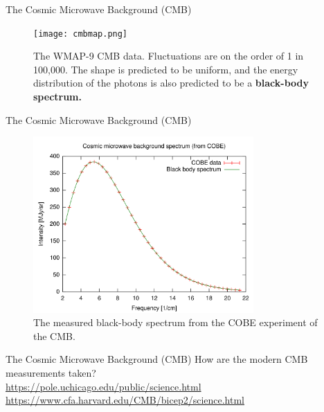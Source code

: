 \documentclass{beamer}
\begin{document}
\begin{frame}{The Cosmic Microwave Background (CMB)}
\begin{figure}
\centering
\texttt{[image: cmbmap.png]}
\caption{\label{fig:cmb6} The WMAP-9 CMB data.  Fluctuations are on the order of 1 in 100,000.  The shape is predicted to be uniform, and the energy distribution of the photons is also predicted to be a \textbf{black-body spectrum.}}
\end{figure}
\end{frame}

\begin{frame}{The Cosmic Microwave Background (CMB)}
\begin{figure}
\centering
\includegraphics[width=0.75\textwidth]{Cmbr.png}
\caption{\label{fig:cmb7} The measured black-body spectrum from the COBE experiment of the CMB.}
\end{figure}
\end{frame}

\begin{frame}{The Cosmic Microwave Background (CMB)}
\small
How are the modern CMB measurements taken? \\ \vspace{0.25cm}
\url{https://pole.uchicago.edu/public/science.html} \\ \vspace{0.25cm}
\url{https://www.cfa.harvard.edu/CMB/bicep2/science.html}
\end{frame}
\end{document}

